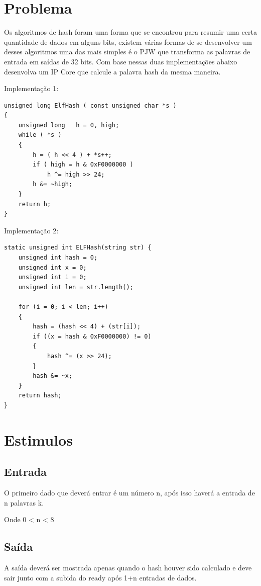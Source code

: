 \documentclass[
    12pt,
    a4paper,
    oneside,
    chapter=TITLE,
    section=TITLE,
    subsection=TITLE,
    subsubsection=TITLE,
    english,
    french,
    spanish,
    brazil,
    ]{abntex2}
\begin{document}
\frenchspacing 
\imprimircapa
\imprimirfolhaderosto

\tableofcontents*
\cleardoublepage

\textual

\chapter{Problema}
Os algoritmos de hash foram uma forma que se encontrou para resumir uma certa quantidade de dados em alguns bits, existem várias formas de se desenvolver um desses algoritmos uma das mais simples é o PJW que transforma as palavras de entrada em saídas de 32 bits. Com base nessas duas implementações abaixo desenvolva um IP Core que calcule a palavra hash da mesma maneira.

\par
Implementação 1:
\begin{lstlisting}
unsigned long ElfHash ( const unsigned char *s )
{
    unsigned long   h = 0, high;
    while ( *s )
    {
        h = ( h << 4 ) + *s++;
        if ( high = h & 0xF0000000 )
            h ^= high >> 24;
        h &= ~high;
    }
    return h;
}
\end{lstlisting}

\par
Implementação 2:
\begin{lstlisting}
static unsigned int ELFHash(string str) {
    unsigned int hash = 0;
    unsigned int x = 0;
    unsigned int i = 0;
    unsigned int len = str.length();

    for (i = 0; i < len; i++)
    {
        hash = (hash << 4) + (str[i]);
        if ((x = hash & 0xF0000000) != 0)
        {
            hash ^= (x >> 24);
        }
        hash &= ~x;
    }
    return hash;
}
\end{lstlisting}



\chapter{Estimulos}
\section{Entrada}
O primeiro dado que deverá entrar é um número n, após isso haverá a entrada de n palavras k.
\par
Onde 0 < n < 8

\section{Saída}
A saída deverá ser mostrada apenas quando o hash houver sido calculado e deve sair junto com a subida do ready após 1+n entradas de dados.
\end{document}
